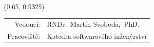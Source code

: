 \documentclass[a0paper]{uioposter}
\begin{document}
\begin{frame}
  \begin{textblock}{0.5}(0.65, 0.9325)
    \color{white}
    \sffamily
    \begin{tabular}{rl}
      Vedoucí:    & RNDr.~Martin Svoboda,~PhD.
      \\
      Pracoviště: & Katedra softwarového inženýrství
    \end{tabular}
  \end{textblock}


\end{frame}
\end{document}
